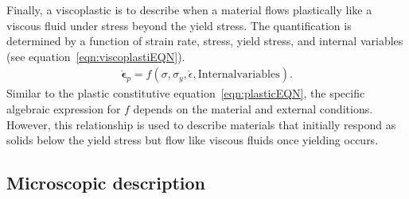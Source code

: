 Finally, a viscoplastic is to describe when a material flows plastically like a viscous fluid under stress beyond the yield stress.
The quantification is determined by a function of strain rate, stress, yield stress, and internal variables (see equation~\eqref{eqn:viscoplastiEQN}).
\begin{gather}
    \dot{\bm{\epsilon}}_{p} = f\left(\sigma,\sigma_y,\dot{\epsilon},\mathrm{Internal variables}\right)\label{eqn:viscoplastiEQN}.
\end{gather}
Similar to the plastic constitutive equation~\eqref{eqn:plasticEQN}, the specific algebraic expression for $f$ depends on the material and external conditions. 
However, this relationship is used to describe materials that initially respond as solids below the yield stress but flow like viscous fluids once yielding occurs.

\subsection{Microscopic description}

